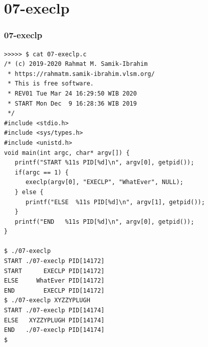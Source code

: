 \documentclass[aspectratio=169, xcolor=table, notheorems, hyperref={pdfpagelabels=false}]{beamer}
\begin{document}
\section{07-execlp}
\begin{frame}[fragile]
\frametitle{07-execlp}
\begin{lstlisting}[basicstyle=\ttfamily\tiny]
>>>>> $ cat 07-execlp.c 
/* (c) 2019-2020 Rahmat M. Samik-Ibrahim
 * https://rahmatm.samik-ibrahim.vlsm.org/
 * This is free software.
 * REV01 Tue Mar 24 16:29:50 WIB 2020
 * START Mon Dec  9 16:28:36 WIB 2019
 */
#include <stdio.h>
#include <sys/types.h>
#include <unistd.h>
void main(int argc, char* argv[]) {
   printf("START %11s PID[%d]\n", argv[0], getpid());
   if(argc == 1) {
      execlp(argv[0], "EXECLP", "WhatEver", NULL);
   } else {
      printf("ELSE  %11s PID[%d]\n", argv[1], getpid());
   }
   printf("END   %11s PID[%d]\n", argv[0], getpid());
}

$ ./07-execlp 
START ./07-execlp PID[14172]
START      EXECLP PID[14172]
ELSE     WhatEver PID[14172]
END        EXECLP PID[14172]
$ ./07-execlp XYZZYPLUGH
START ./07-execlp PID[14174]
ELSE   XYZZYPLUGH PID[14174]
END   ./07-execlp PID[14174]
$ 

\end{lstlisting}
\end{frame}

\end{document}
